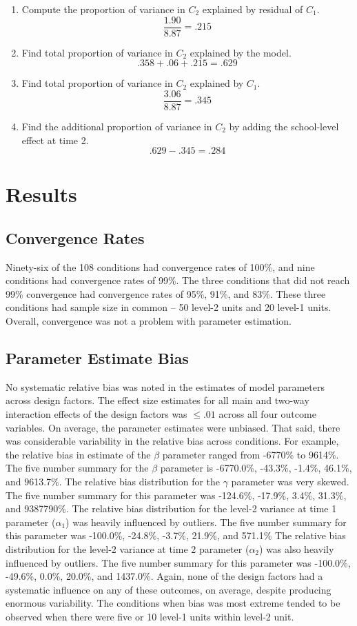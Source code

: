\documentclass[man, noextraspace, floatsintext, 12pt]{apa7}
\begin{document}
\begin{enumerate}
\item Compute the proportion of variance in $C_2$ explained by residual of $C_1$.
\[ \frac{1.90}{8.87} = .215 \]

\item Find total proportion of variance in $C_2$ explained by the model.
\[ .358 + .06 + .215 = .629 \]

\item Find total proportion of variance in $C_2$ explained by $C_1$.
\[ \frac{3.06}{8.87}=.345 \]

\item Find the additional proportion of variance in $C_2$ by adding the school-level effect at time 2.
\[ .629 - .345 = .284 \]

\end{enumerate}


\section*{Results}
\subsection*{Convergence Rates}
Ninety-six of the 108 conditions had convergence rates of 100\%, and nine conditions had convergence rates of 99\%. The three conditions that did not reach 99\% convergence had convergence rates of 95\%, 91\%, and 83\%. These three conditions had sample size in common -- 50 level-2 units and 20 level-1 units. Overall, convergence was not a problem with parameter estimation.

\subsection*{Parameter Estimate Bias}
No systematic relative bias was noted in the estimates of model parameters across design factors. The effect size estimates for all main and two-way interaction effects of the design factors was $\leq .01$ across all four outcome variables. On average, the parameter estimates were unbiased. That said, there was considerable variability in the relative bias across conditions. For example, the relative bias in estimate of the $\beta$ parameter ranged from -6770\% to 9614\%. The five number summary for the $\beta$ parameter is -6770.0\%, -43.3\%, -1.4\%, 46.1\%, and 9613.7\%. The relative bias distribution for the $\gamma$ parameter was very skewed. The five number summary for this parameter was -124.6\%, -17.9\%, 3.4\%, 31.3\%, and 9387790\%. The relative bias distribution for the level-2 variance at time 1 parameter ($\alpha_1$) was heavily influenced by outliers. The five number summary for this parameter was -100.0\%, -24.8\%, -3.7\%, 21.9\%, and 571.1\% The relative bias distribution for the level-2 variance at time 2 parameter ($\alpha_2$) was also heavily influenced by outliers. The five number summary for this parameter was -100.0\%, -49.6\%, 0.0\%, 20.0\%, and 1437.0\%. Again, none of the design factors had a systematic influence on any of these outcomes, on average, despite producing enormous variability. The conditions when bias was most extreme tended to be observed when there were five or 10 level-1 units within level-2 unit. 
\end{document}
